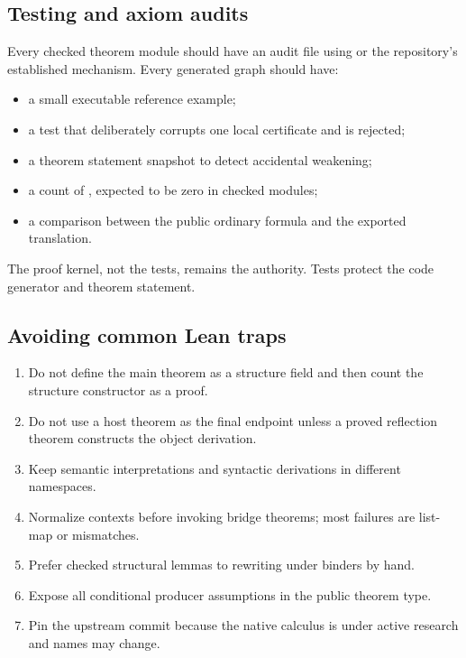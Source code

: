 \subsection{Testing and axiom audits}

Every checked theorem module should have an audit file using 
or the repository's established mechanism.  Every generated graph should have:

\begin{itemize}
\item a small executable reference example;
\item a test that deliberately corrupts one local certificate and is rejected;
\item a theorem statement snapshot to detect accidental weakening;
\item a count of , expected to be zero in checked modules;
\item a comparison between the public ordinary formula and the exported
translation.
\end{itemize}

The proof kernel, not the tests, remains the authority.  Tests protect the code
generator and theorem statement.

\subsection{Avoiding common Lean traps}

\begin{enumerate}
\item Do not define the main theorem as a structure field and then count the
structure constructor as a proof.
\item Do not use a host theorem  as the final endpoint
unless a proved reflection theorem constructs the object derivation.
\item Keep semantic interpretations and syntactic derivations in different
namespaces.
\item Normalize contexts before invoking bridge theorems; most failures are
list-map or  mismatches.
\item Prefer checked structural lemmas to rewriting under binders by hand.
\item Expose all conditional producer assumptions in the public theorem type.
\item Pin the upstream commit because the native calculus is under active
research and names may change.
\end{enumerate}
